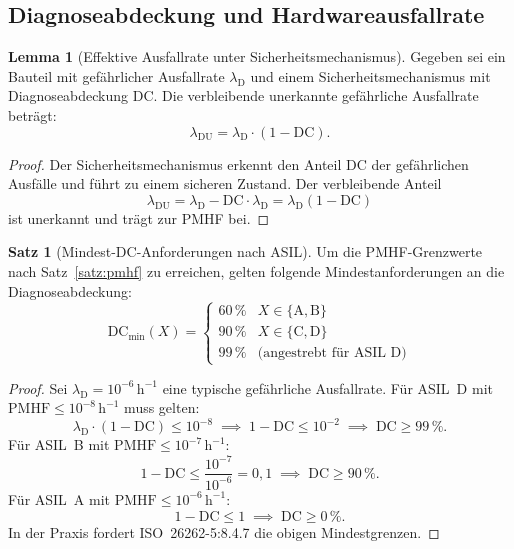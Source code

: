﻿\documentclass[a4paper,12pt]{article}
\theoremstyle{definition}
\newtheorem{satz}{Satz}
\newtheorem{lemma}{Lemma}
\begin{document}
\subsection{Diagnoseabdeckung und Hardwareausfallrate}

\begin{lemma}[Effektive Ausfallrate unter Sicherheitsmechanismus]
\label{lem:effektiv}
  Gegeben sei ein Bauteil mit gefährlicher Ausfallrate
  $\lambda_{\mathrm{D}}$ und einem Sicherheitsmechanismus mit
  Diagnoseabdeckung $\mathrm{DC}$.
  Die verbleibende unerkannte gefährliche Ausfallrate beträgt:
  \[
    \lambda_{\mathrm{DU}}
    = \lambda_{\mathrm{D}} \cdot (1 - \mathrm{DC}).
  \]
\end{lemma}

\begin{proof}
  Der Sicherheitsmechanismus erkennt den Anteil $\mathrm{DC}$
  der gefährlichen Ausfälle und führt zu einem sicheren Zustand.
  Der verbleibende Anteil
  \[
    \lambda_{\mathrm{DU}}
    = \lambda_{\mathrm{D}} - \mathrm{DC} \cdot \lambda_{\mathrm{D}}
    = \lambda_{\mathrm{D}}(1 - \mathrm{DC})
  \]
  ist unerkannt und trägt zur PMHF bei.
\end{proof}

\begin{satz}[Mindest-DC-Anforderungen nach ASIL]
\label{satz:dc}
  Um die PMHF-Grenzwerte nach Satz~\ref{satz:pmhf} zu erreichen,
  gelten folgende Mindestanforderungen an die Diagnoseabdeckung:
  \[
    \mathrm{DC}_{\min}(X) = \begin{cases}
      60\,\% & X \in \{\mathrm{A}, \mathrm{B}\}\\
      90\,\% & X \in \{\mathrm{C}, \mathrm{D}\}\\
      99\,\% & \text{(angestrebt für ASIL~D)}
    \end{cases}
  \]
\end{satz}

\begin{proof}
  Sei $\lambda_{\mathrm{D}} = 10^{-6}\,\mathrm{h}^{-1}$ eine typische
  gefährliche Ausfallrate. Für ASIL~D mit
  $\mathrm{PMHF} \leq 10^{-8}\,\mathrm{h}^{-1}$ muss gelten:
  \[
    \lambda_{\mathrm{D}} \cdot (1 - \mathrm{DC}) \leq 10^{-8}
    \;\implies\;
    1 - \mathrm{DC} \leq 10^{-2}
    \;\implies\;
    \mathrm{DC} \geq 99\,\%.
  \]
  Für ASIL~B mit $\mathrm{PMHF} \leq 10^{-7}\,\mathrm{h}^{-1}$:
  \[
    1 - \mathrm{DC} \leq \frac{10^{-7}}{10^{-6}} = 0{,}1
    \;\implies\;
    \mathrm{DC} \geq 90\,\%.
  \]
  Für ASIL~A mit $\mathrm{PMHF} \leq 10^{-6}\,\mathrm{h}^{-1}$:
  \[
    1 - \mathrm{DC} \leq 1
    \;\implies\;
    \mathrm{DC} \geq 0\,\%.
  \]
  In der Praxis fordert ISO~26262-5:8.4.7 die obigen Mindestgrenzen.
\end{proof}
\end{document}

